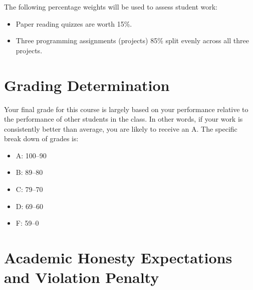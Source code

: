 \documentclass[11pt,article,oneside]{memoir} %
\begin{document}
The following percentage weights will be used to assess student work:

\begin{itemize}
    \item Paper reading quizzes are worth 15\%.
    \item Three programming assignments (projects) 85\% split evenly across all three projects.
\end{itemize}



\section{Grading Determination}\label{sec:grading_tentative_}%

Your final grade for this course is largely based on your performance relative to the performance
of other students in the class. In other words, if your work is consistently better than average, you
are likely to receive an A.
The specific break down of grades is:

\begin{itemize}
    \item A: 100--90
    \item B: 89--80
    \item C: 79--70
    \item D: 69--60
    \item F: 59--0
\end{itemize}

\section{Academic Honesty Expectations and Violation Penalty}
\end{document}
